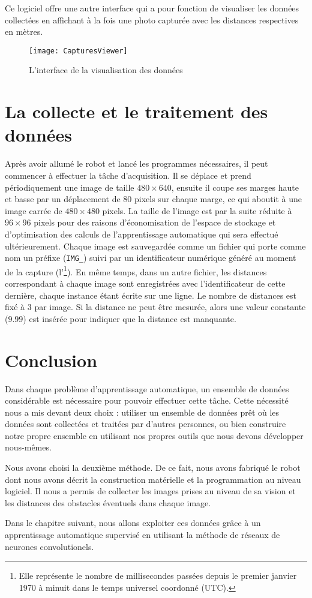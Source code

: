 Ce logiciel offre une autre interface qui a pour fonction de visualiser les
données collectées en affichant à la fois une photo capturée avec les distances
respectives en mètres.

\begin{figure}[H]
\begin{center}
\texttt{[image: CapturesViewer]}
\caption{L'interface de la visualisation des données}
\end{center}
\end{figure}

\section{La collecte et le traitement des données}

Après avoir allumé le robot et lancé les programmes nécessaires, il peut commencer
à effectuer la tâche d'acquisition. Il se déplace et prend périodiquement une image
de taille $480 \times 640$, ensuite il coupe ses marges haute et basse par un
déplacement de $80$ pixels sur chaque marge, ce qui aboutit à une image carrée
de $480 \times 480$ pixels. La taille de l'image est par la suite réduite à
$96 \times 96$ pixels pour des raisons d'économisation de l'espace de stockage
et d'optimisation des calculs de l'apprentissage automatique qui sera effectué
ultérieurement. Chaque image est sauvegardée comme un fichier qui porte comme
nom un préfixe (\texttt{IMG\_}) suivi par un identificateur numérique généré
au moment de la capture (l'\footnote{Elle représente le nombre de
millisecondes passées depuis le premier janvier 1970 à minuit dans le temps
universel coordonné (UTC).}). En même temps, dans un autre fichier, les distances
correspondant à chaque image sont enregistrées avec l'identificateur de cette
dernière, chaque instance étant écrite sur une ligne. Le nombre de distances
est fixé à $3$ par image. Si la distance ne peut être mesurée, alors une valeur
constante ($9.99$) est insérée pour indiquer que la distance est manquante.

\section{Conclusion}

Dans chaque problème d'apprentissage automatique, un ensemble de données considérable
est nécessaire pour pouvoir effectuer cette tâche. Cette nécessité nous a mis devant
deux choix : utiliser un ensemble de données prêt où les données sont collectées
et traitées par d'autres personnes, ou bien construire notre propre ensemble en
utilisant nos propres outils que nous devons développer nous-mêmes.

Nous avons choisi la deuxième méthode. De ce fait, nous avons
fabriqué le robot dont nous avons décrit la construction matérielle et la
programmation au niveau logiciel. Il nous a permis de collecter les images
prises au niveau de sa vision et les distances des obstacles éventuels dans
chaque image.

Dans le chapitre suivant, nous allons exploiter ces données grâce à
un apprentissage automatique supervisé en utilisant la méthode de
réseaux de neurones convolutionels.

